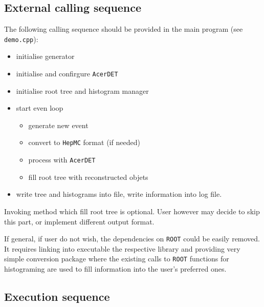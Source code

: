 \subsection{External calling sequence}

The following calling sequence should be provided
in the main program (see {\tt demo.cpp}):
\begin{itemize}
\item
initialise  generator
\item
initialise and confirgure {\tt AcerDET}
\item
initialise root tree and histogram manager
\item
start even loop
\begin{itemize}
\item
generate new event
\item
convert to  {\tt HepMC} format (if needed)
\item
process with  {\tt AcerDET}
\item
fill root tree with reconstructed objets
\end{itemize}
\item
write tree and histograms into file, write information
into log file.
\end{itemize}

Invoking method which fill root tree is optional. 
User however may decide to skip this part, or implement
different output format.

If general, if user do not wish, the dependencies on {\tt ROOT} could be easily
removed. It requires linking into executable the respective library 
and providing very simple conversion package where the existing calls to
{\tt ROOT} functions for histograming
are used  to fill information into the user's preferred ones.


\subsection{Execution sequence}

